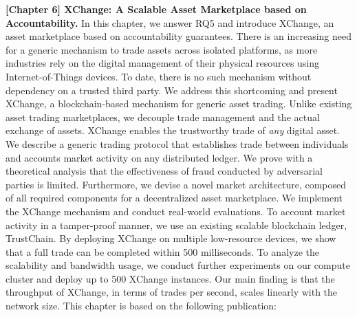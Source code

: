 \textbf{[Chapter 6] XChange: A Scalable Asset Marketplace based on Accountability.}
In this chapter, we answer RQ5 and introduce XChange, an asset marketplace based on accountability guarantees.
There is an increasing need for a generic mechanism to trade assets across isolated platforms, as more industries rely on the digital management of their physical resources using Internet-of-Things devices.
To date, there is no such mechanism without dependency on a trusted third party.
We address this shortcoming and present XChange, a blockchain-based mechanism for generic asset trading.
Unlike existing asset trading marketplaces, we decouple trade management and the actual exchange of assets.
XChange enables the trustworthy trade of \emph{any} digital asset.
We describe a generic trading protocol that establishes trade between individuals and accounts market activity on any distributed ledger.
We prove with a theoretical analysis that the effectiveness of fraud conducted by adversarial parties is limited.
Furthermore, we devise a novel market architecture, composed of all required components for a decentralized asset marketplace.
We implement the XChange mechanism and conduct real-world evaluations.
To account market activity in a tamper-proof manner, we use an existing scalable blockchain ledger, TrustChain.
By deploying XChange on multiple low-resource devices, we show that a full trade can be completed within 500 milliseconds.
To analyze the scalability and bandwidth usage, we conduct further experiments on our compute cluster and deploy up to 500 XChange instances.
Our main finding is that the throughput of XChange, in terms of trades per second, scales linearly with the network size.
This chapter is based on the following publication:

\\

